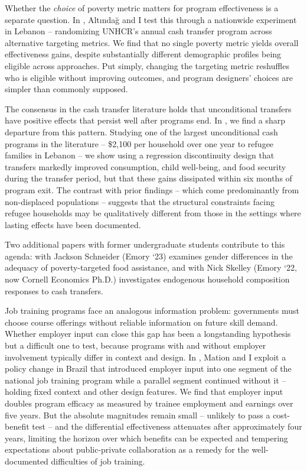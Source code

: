 \documentclass[10pt, letter]{article}
\begin{document}
Whether the \emph{choice} of poverty metric matters for program effectiveness is a separate question. In , Altındağ and I test this through a nationwide experiment in Lebanon -- randomizing UNHCR’s annual cash transfer program across alternative targeting metrics. We find that no single poverty metric yields overall effectiveness gains, despite substantially different demographic profiles being eligible across approaches. Put simply, changing the targeting metric reshuffles who is eligible without improving outcomes, and program designers’ choices are simpler than commonly supposed.

The consensus in the cash transfer literature holds that unconditional transfers have positive effects that persist well after programs end. In , we find a sharp departure from this pattern. Studying one of the largest unconditional cash programs in the literature -- \$2,100 per household over one year to refugee families in Lebanon -- we show using a regression discontinuity design that transfers markedly improved consumption, child well-being, and food security during the transfer period, but that these gains dissipated within six months of program exit. The contrast with prior findings -- which come predominantly from non-displaced populations -- suggests that the structural constraints facing refugee households may be qualitatively different from those in the settings where lasting effects have been documented.

Two additional papers with former undergraduate students contribute to this agenda:  with Jackson Schneider (Emory ‘23) examines gender differences in the adequacy of poverty-targeted food assistance, and  with Nick Skelley (Emory ‘22, now Cornell Economics Ph.D.) investigates endogenous household composition responses to cash transfers.

Job training programs face an analogous information problem: governments must choose course offerings without reliable information on future skill demand. Whether employer input can close this gap has been a longstanding hypothesis but a difficult one to test, because programs with and without employer involvement typically differ in context and design. In , Mation and I exploit a policy change in Brazil that introduced employer input into one segment of the national job training program while a parallel segment continued without it -- holding fixed context and other design features. We find that employer input doubles program efficacy as measured by trainee employment and earnings over five years. But the absolute magnitudes remain small -- unlikely to pass a cost-benefit test -- and the differential effectiveness attenuates after approximately four years, limiting the horizon over which benefits can be expected and tempering expectations about public-private collaboration as a remedy for the well-documented difficulties of job training.
\end{document}
